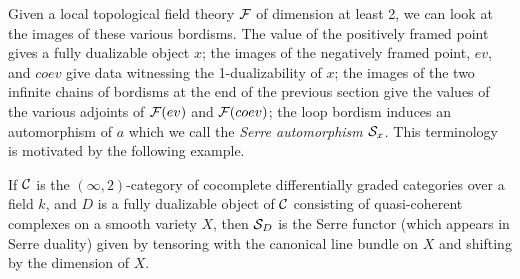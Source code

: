 \documentclass{amsart}
\begin{document}
\begin{center} 
\end{center}

Given a local topological field theory $\mathcal F$ of dimension at least 2, we can look at the images of these various bordisms. The value of the positively framed point gives a fully dualizable object $x$; the images of the negatively framed point, $ev$, and $coev$ give data witnessing the 1-dualizability of $x$; the images of the two infinite chains of bordisms at the end of the previous section give the values of the various adjoints of $\mathcal F(ev)$ and $\mathcal F(coev)$; the loop bordism induces an automorphism of $a$ which we call the {\em Serre automorphism $\mathcal S_x$}.  This terminology is motivated by the following example.
\begin{example}
If $\mathcal C$ is the $(\infty,2)$-category of cocomplete differentially graded categories over a field $k$, and $D$ is a fully dualizable object of $\mathcal C$ consisting of quasi-coherent complexes on a smooth variety $X$, then $\mathcal S_D$ is the Serre functor (which appears in Serre duality) given by tensoring with the canonical line bundle on $X$ and shifting by the dimension of $X$.
\end{example}
\end{document}
